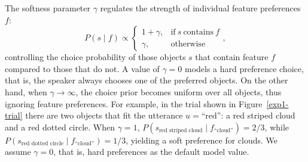 \documentclass[10pt,a4paper]{article}
\begin{document}
The softness parameter $\gamma$ regulates the strength of individual feature preferences $f$:
$$ P(s \mid f) \propto \begin{cases}
1 + \gamma, & \text{if}\ s\ \text{contains}\ f \\
\gamma, & \text{otherwise}
\end{cases},$$
controlling the choice probability of those objects $s$ that contain feature $f$ compared to those that do not.  
A value of $\gamma=0$ models a hard preference choice, that is, the speaker always chooses one of the preferred objects. 
On the other hand, when $\gamma \rightarrow \infty$, the choice prior becomes uniform over all objects, thus ignoring feature preferences. 
 For example, in the trial shown in Figure~\ref{exp1-trial} there are two objects that fit the utterance $u=\text{``red''}$: a red striped cloud and a red dotted circle.
 When $\gamma=1$, $P(s_{\textrm{red\ striped\ cloud}}\mid f_{\textrm{``cloud''}}) = 2/3$, while
 $P(s_{\textrm{red\ dotted\ circle}}\mid f_{\textrm{``cloud''}})= 1/3$, yielding a soft preference for clouds.
 We assume $\gamma=0$, that is, hard preferences as the default model value.
\end{document}
